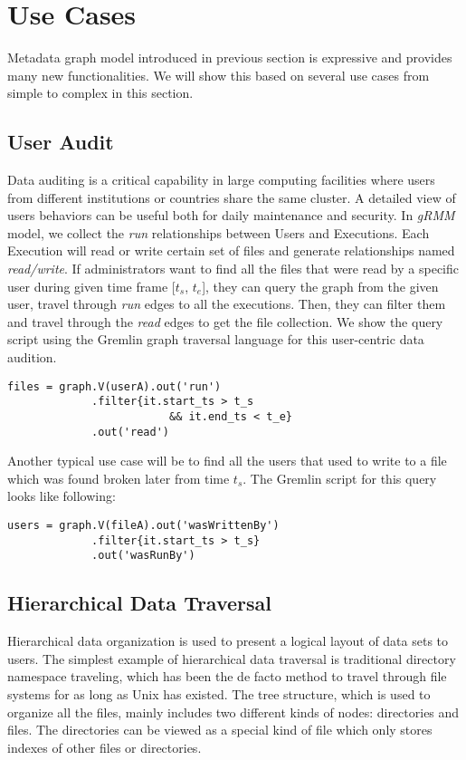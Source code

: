 \section{Use Cases}

Metadata graph model introduced in previous section is expressive and provides many new functionalities. We will show this based on several use cases from simple to complex in this section.

\subsection{User Audit}
Data auditing is a critical capability in large computing facilities where users from different institutions or countries share the same cluster. A detailed view of users behaviors can be useful both for daily maintenance and security. In \textit{gRMM} model, we collect the \textit{run} relationships between Users and Executions. Each Execution will read or write certain set of files and generate relationships named \textit{read/write}. If administrators want to find all the files that were read by a specific user during given time frame [$t_s$, $t_e$], they can query the graph from the given user, travel through \textit{run} edges to all the executions. Then, they can filter them and travel through the \textit{read} edges to get the file collection. We show the query script using the Gremlin graph traversal language for this user-centric data audition.

\begin{lstlisting}
files = graph.V(userA).out('run')
		     .filter{it.start_ts > t_s 
		     		     && it.end_ts < t_e}
		     .out('read')
\end{lstlisting}

Another typical use case will be to find all the users that used to write to a file which was found broken later from time $t_s$. The Gremlin script for this query looks like following:
\begin{lstlisting}
users = graph.V(fileA).out('wasWrittenBy')
		     .filter{it.start_ts > t_s}
		     .out('wasRunBy')
\end{lstlisting}


\subsection{Hierarchical Data Traversal}
Hierarchical data organization is used to present a logical layout of data sets to users. The simplest example of hierarchical data traversal is traditional directory namespace traveling, which has been the de facto method to travel through file systems for as long as Unix has existed. The tree structure, which is used to organize all the files, mainly includes two different kinds of nodes: directories and files. The directories can be viewed as a special kind of file which only stores indexes of other files or directories. 

